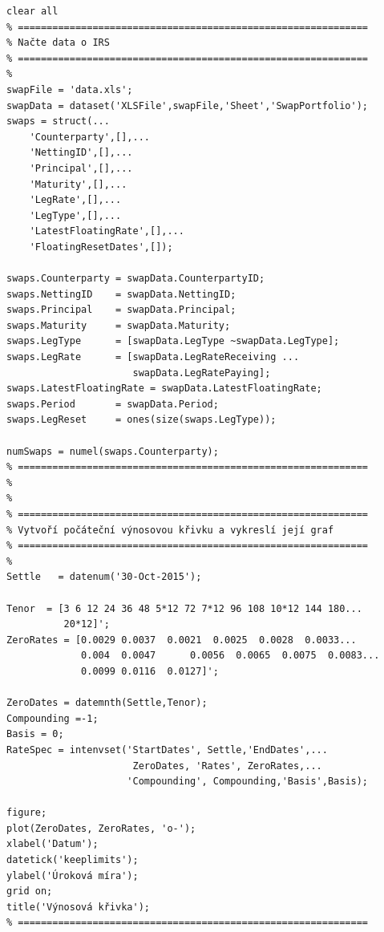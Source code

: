 \documentclass[a4paper,12pt]{report}
\theoremstyle{definition} \newtheorem{definice}[veta]{Definice}
\theoremstyle{remark}
\begin{document}
\begin{verbatim}
clear all
% =============================================================
% Načte data o IRS
% =============================================================
%
swapFile = 'data.xls';
swapData = dataset('XLSFile',swapFile,'Sheet','SwapPortfolio');
swaps = struct(...
    'Counterparty',[],...
    'NettingID',[],...
    'Principal',[],...
    'Maturity',[],...
    'LegRate',[],...
    'LegType',[],...
    'LatestFloatingRate',[],...
    'FloatingResetDates',[]);

swaps.Counterparty = swapData.CounterpartyID;
swaps.NettingID    = swapData.NettingID;
swaps.Principal    = swapData.Principal;
swaps.Maturity     = swapData.Maturity;
swaps.LegType      = [swapData.LegType ~swapData.LegType];
swaps.LegRate      = [swapData.LegRateReceiving ... 
                      swapData.LegRatePaying];
swaps.LatestFloatingRate = swapData.LatestFloatingRate;
swaps.Period       = swapData.Period;
swaps.LegReset     = ones(size(swaps.LegType));

numSwaps = numel(swaps.Counterparty);
% =============================================================
%
%
% =============================================================
% Vytvoří počáteční výnosovou křivku a vykreslí její graf
% =============================================================
%
Settle   = datenum('30-Oct-2015');

Tenor  = [3 6 12 24 36 48 5*12 72 7*12 96 108 10*12 144 180... 
          20*12]';
ZeroRates = [0.0029	0.0037	0.0021	0.0025	0.0028	0.0033...	
             0.004	0.0047		0.0056	0.0065	0.0075	0.0083...
             0.0099	0.0116	0.0127]';

ZeroDates = datemnth(Settle,Tenor);
Compounding =-1;
Basis = 0;
RateSpec = intenvset('StartDates', Settle,'EndDates',... 
                      ZeroDates, 'Rates', ZeroRates,...
                     'Compounding', Compounding,'Basis',Basis);

figure;
plot(ZeroDates, ZeroRates, 'o-');
xlabel('Datum');
datetick('keeplimits');
ylabel('Úroková míra');
grid on;
title('Výnosová křivka');
% =============================================================
\end{verbatim}
\end{document}
